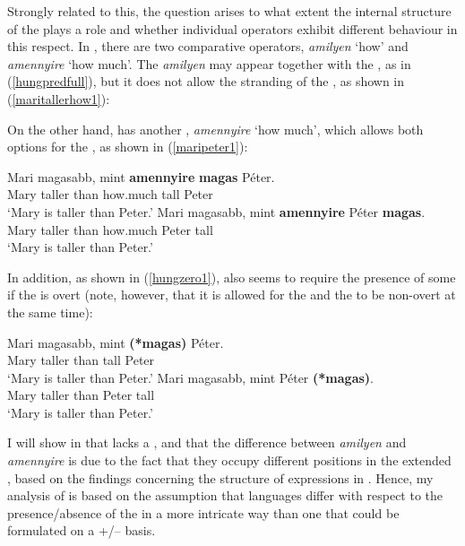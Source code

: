 Strongly related to this, the question arises to what extent the internal structure of the  plays a role and whether individual operators exhibit different behaviour in this respect. In , there are two comparative operators, \textit{amilyen} `how' and \textit{amennyire} `how much'. The  \textit{amilyen} may appear together with the , as in (\ref{hungpredfull}), but it does not allow the stranding of the , as shown in (\ref{maritallerhow1}):

\z

On the other hand,  has another , \textit{amennyire} `how much', which allows both options for the , as shown in (\ref{maripeter1}):

\ea \label{maripeter1}
\ea \gll Mari	magasabb,	mint \textbf{amennyire} \textbf{magas} Péter.\\
Mary taller	than how.much	tall Peter\\
\glt `Mary is taller than Peter.'
\ex \gll Mari	magasabb,	mint \textbf{amennyire} Péter \textbf{magas}.\\
Mary taller	than	how.much Peter tall\\
\glt `Mary is taller than Peter.'
\z
\z

In addition, as shown in (\ref{hungzero1}),  also seems to require the presence of some  if the  is overt (note, however, that it is allowed for the  and the  to be non-overt at the same time):

\ea \label{hungzero1}
\ea \gll Mari	magasabb,	mint \textbf{(*magas)} Péter.\\
Mary taller	than \phantom{\textbf{(*}}tall Peter\\
\glt `Mary is taller than Peter.'
\ex \gll Mari	magasabb,	mint Péter \textbf{(*magas)}.\\
Mary taller	than Peter \phantom{\textbf{(*}}tall\\
\glt `Mary is taller than Peter.'
\z
\z

I will show in  that  lacks a , and that the difference between \textit{amilyen} and \textit{amennyire} is due to the fact that they occupy different positions in the extended , based on the findings concerning the structure of  expressions in . Hence, my analysis of  is based on the assumption that languages differ with respect to the presence/absence of the  in a more intricate way than one that could be formulated on a +/-- basis.


